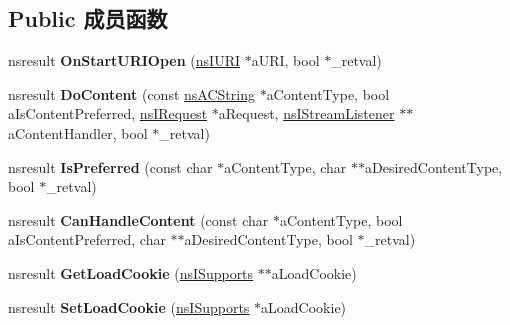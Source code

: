 \subsection*{Public 成员函数}
\begin{DoxyCompactItemize}
\item 
\mbox{\label{interfacens_i_u_r_i_content_listener_a1e1a47ba7f3f9b974c2047426a4747f7}} 
nsresult {\bfseries On\+Start\+U\+R\+I\+Open} (\hyperlink{interfacens_i_u_r_i}{ns\+I\+U\+RI} $\ast$a\+U\+RI, bool $\ast$\+\_\+retval)
\item 
\mbox{\label{interfacens_i_u_r_i_content_listener_ae191a566c0311d1bf0f7d9b676260548}} 
nsresult {\bfseries Do\+Content} (const \hyperlink{structns_c_string_container}{ns\+A\+C\+String} $\ast$a\+Content\+Type, bool a\+Is\+Content\+Preferred, \hyperlink{interfacens_i_request}{ns\+I\+Request} $\ast$a\+Request, \hyperlink{interfacens_i_stream_listener}{ns\+I\+Stream\+Listener} $\ast$$\ast$a\+Content\+Handler, bool $\ast$\+\_\+retval)
\item 
\mbox{\label{interfacens_i_u_r_i_content_listener_a22166effccf96433b95335ccf4c663c9}} 
nsresult {\bfseries Is\+Preferred} (const char $\ast$a\+Content\+Type, char $\ast$$\ast$a\+Desired\+Content\+Type, bool $\ast$\+\_\+retval)
\item 
\mbox{\label{interfacens_i_u_r_i_content_listener_a9913561d339cbd3d42e9c48989c418d7}} 
nsresult {\bfseries Can\+Handle\+Content} (const char $\ast$a\+Content\+Type, bool a\+Is\+Content\+Preferred, char $\ast$$\ast$a\+Desired\+Content\+Type, bool $\ast$\+\_\+retval)
\item 
\mbox{\label{interfacens_i_u_r_i_content_listener_a9861dc487688a5649ef4b6ddfae6e8a9}} 
nsresult {\bfseries Get\+Load\+Cookie} (\hyperlink{interfacens_i_supports}{ns\+I\+Supports} $\ast$$\ast$a\+Load\+Cookie)
\item 
\mbox{\label{interfacens_i_u_r_i_content_listener_a708bbe7d3dc7437e2f7d54864f56fb2f}} 
nsresult {\bfseries Set\+Load\+Cookie} (\hyperlink{interfacens_i_supports}{ns\+I\+Supports} $\ast$a\+Load\+Cookie)

\end{DoxyCompactItemize}

